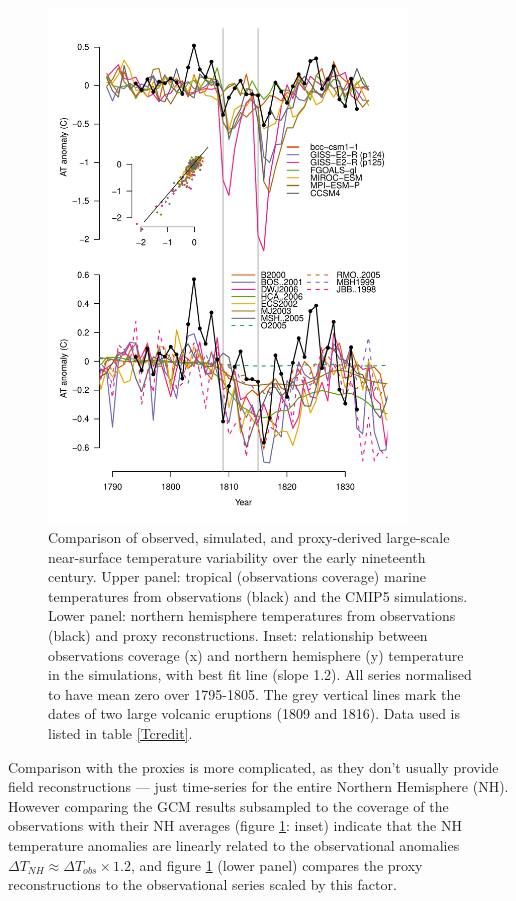 \documentclass[CP]{copernicus}
\begin{document}
\begin{figure}[!hbp]
\begin{center}
\includegraphics[angle=0, width=0.85\textwidth]{fig9.pdf}
\caption{Comparison of observed, simulated, and proxy-derived large-scale near-surface temperature variability over the early nineteenth century. Upper panel: tropical (observations coverage) marine temperatures from observations (black) and the CMIP5 simulations. Lower panel: northern hemisphere temperatures from observations (black) and proxy reconstructions. Inset: relationship between observations coverage (x) and northern hemisphere (y) temperature in the simulations, with best fit line (slope 1.2). All series normalised to have mean zero over 1795-1805. The grey vertical lines mark the dates of two large volcanic eruptions (1809 and 1816). Data used is listed in table \ref{Tcredit}.}
\label{Fconst1}
\end{center}
\end{figure}

Comparison with the proxies is more complicated, as they don't usually provide field reconstructions --- just time-series for the entire Northern Hemisphere (NH). However comparing the GCM results subsampled to the coverage of the observations with their NH averages (figure \ref{Fconst1}: inset) indicate that the NH temperature anomalies are linearly related to the observational anomalies $\Delta T_{NH} \approx \Delta T_{obs}\times 1.2$, and figure \ref{Fconst1} (lower panel) compares the proxy reconstructions to the observational series scaled by this factor. 
\end{document}
